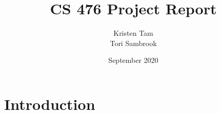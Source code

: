 \documentclass{article}
\title{CS 476 Project Report}
\author{Kristen Tam \\ Tori Sambrook}
\date{September 2020}
\begin{document}
\maketitle

\newpage
\section{Introduction}
\end{document}
